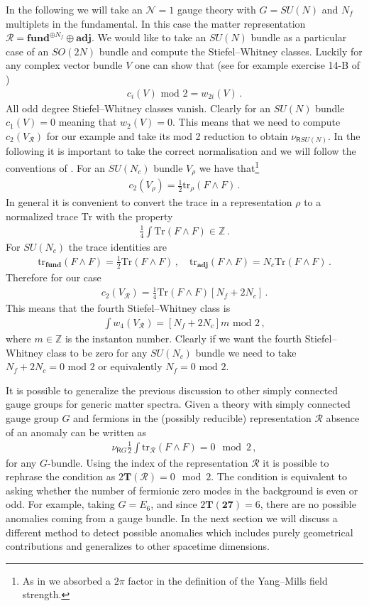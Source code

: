 \documentclass[12pt]{article}%
\numberwithin{equation}{section}
\newcommand{\al}[1]{\begin{align}#1\end{align}}
\renewcommand{\(}{\left(}
\renewcommand{\)}{\right)}
\renewcommand{\[}{\left[}
\renewcommand{\]}{\right]}
\begin{document}
In the following we will take an $\mathcal N=1$ gauge theory with $G = SU(N)$ and $N_f$ multiplets in the fundamental. In this case the matter representation $\mathcal R = \textbf{fund}^{\oplus N_f} \oplus \textbf{adj}$. We would like to take an $SU(N)$ bundle as a particular case of an $SO(2N)$ bundle and compute the Stiefel--Whitney classes. Luckily for any complex vector bundle $V$ one can show that (see for example exercise 14-B of \cite{milnor1974characteristic})
%
\al{ c_i (V) \text{ mod } 2 = w_{2i}(V)\,.
}
%
All odd degree Stiefel--Whitney classes vanish. Clearly for an $SU(N)$ bundle $c_1(V) = 0$ meaning that $w_2(V) = 0$. This means that we need to compute $c_2(V_{\mathcal R})$ for our example and take its mod 2 reduction to obtain $\nu_{\mathsf{R}SU(N)}$. In the following it is important to take the correct normalisation and we will follow the conventions of \cite{Ohmori:2014kda}. For an $SU(N_c)$ bundle $V_\rho$ we have that\footnote{As in \cite{Ohmori:2014kda} we absorbed a $2 \pi$ factor in the definition of the Yang--Mills field strength.}
%
\al{ c_2(V_\rho) = \frac{1}{2} \text{tr}_{\rho} \left(F \wedge F\right)\,.
}
%
In general it is convenient to convert the trace in a representation $\rho$ to a normalized trace $\text{Tr}$ with the property
%
\al{ \frac{1}{4}\int \text{Tr} \left(F \wedge F\right) \in \mathbb Z\,.
}
%
For $SU(N_c)$ the trace identities are
%
\al{ \text{tr}_{\mathbf{fund}} \left(F \wedge F \right) =  \frac{1}{2}\text{Tr} \left(F \wedge F \right)\,, \quad \text{tr}_{\mathbf{adj}} \left(F \wedge F \right) =  N_c\text{Tr} \left(F \wedge F \right)\,.
}
%
Therefore for our case
%
\al{ c_2(V_\mathcal R) = \frac{1}{4} \text{Tr}\left(F \wedge F \right) \left[N_f + 2 N_c\right]\,.
}
%
This means that the fourth Stiefel--Whitney class is
%
\al{ \int w_4(V_\mathcal R) = \left[N_f + 2N_c\right] m \text{ mod } 2\,,
}
%
where $m \in \mathbb Z$ is the instanton number. Clearly if we want the fourth Stiefel--Whitney class to be zero for any $SU(N_c)$ bundle we need to take $N_f + 2N_c = 0 \text{ mod } 2 $ or equivalently $N_f = 0 \text{ mod } 2$.

It is possible to generalize the previous discussion to other simply connected gauge groups for generic matter spectra. Given a theory with simply connected gauge group $G$ and fermions in the (possibly reducible) representation $\mathcal R$ absence of an anomaly can be written as
%
\al{ \nu_{\mathsf{R}G}\frac{1}{2}\int \text{tr}_{\mathcal R} (F \wedge F) = 0 \mod 2\,,
}
%
for any $G$-bundle. Using the index of the representation $\mathcal R$ it is possible to rephrase the condition as $2\mathbf T(\mathcal R) = 0 \mod 2$. The condition is equivalent to asking whether the number of fermionic zero modes in the background is even or odd. For example, taking $G= E_6$, and since $2 \mathbf T(\mathbf {27}) = 6$, there are no possible anomalies coming from a gauge bundle.
In the next section we will discuss a different method to detect possible anomalies which includes purely geometrical contributions and generalizes to other spacetime dimensions.
\end{document}
